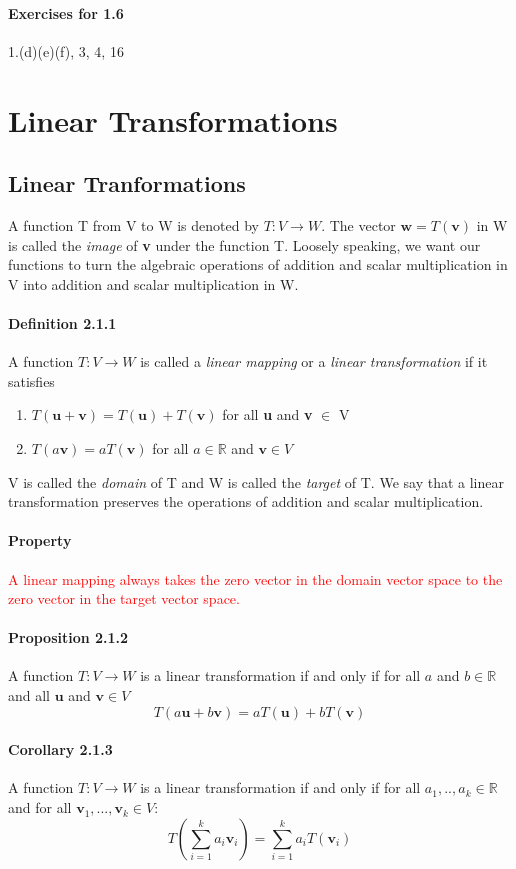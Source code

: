 \documentclass[11pt]{article}
\newcommand{\ti}[1]{\textit{#1}}
\newcommand{\tb}[1]{\textbf{#1}}
\newcommand{\mb}[1]{\mathbb{#1}}
\newcommand{\litran}[0]{$T: V \rightarrow W$ }
\begin{document}
	\paragraph{Exercises for 1.6}
	1.(d)(e)(f), 3, 4, 16
	\newpage
	\section{Linear Transformations}
	\subsection{Linear Tranformations}
	A function T from V to W is denoted by $T: V \rightarrow W$. The vector $\tb{w} = T(\tb{v})$ in W is called the \ti{image} of \tb{v} under the function T. Loosely speaking, we want our functions to turn the algebraic operations of addition and scalar multiplication in V into addition and scalar multiplication in W.
	\paragraph{Definition 2.1.1} A function $T: V \rightarrow W$ is called a \ti{linear mapping} or a \ti{linear transformation} if it satisfies
	\begin{enumerate}
		\item $T(\tb{u} + \tb{v}) = T(\tb{u}) + T(\tb{v})$ for all \tb{u} and \tb{v} $\in$ V
		\item $T(a\tb{v}) = aT(\tb{v})$ for all $a \in \mb{R}$ and $\tb{v} \in V$
	\end{enumerate}
	V is called the \ti{domain} of T and W is called the \ti{target} of T. \newline
	We say that a linear transformation preserves the operations of addition and scalar multiplication.
	\paragraph{Property} \textcolor{red}{A linear mapping always takes the zero vector in the domain vector space to the zero vector in the target vector space.}
	\paragraph{Proposition 2.1.2} A function \litran is a linear transformation if and only if for all $a$ and $b \in \mb{R}$ and all $\tb{u}$ and $\tb{v} \in V$
	$$T(a\tb{u} + b\tb{v}) = aT(\tb{u}) + bT(\tb{v})$$
	\paragraph{Corollary 2.1.3} A function \litran is a linear transformation if and only if for all $a_1, .., a_k \in \mb{R}$ and for all $\tb{v}_1, ..., \tb{v}_k \in V$:
	$$T(\sum^k_{i = 1} a_i \tb{v}_i) = \sum^k_{i = 1}a_iT(\tb{v}_i)$$
	
\end{document}
